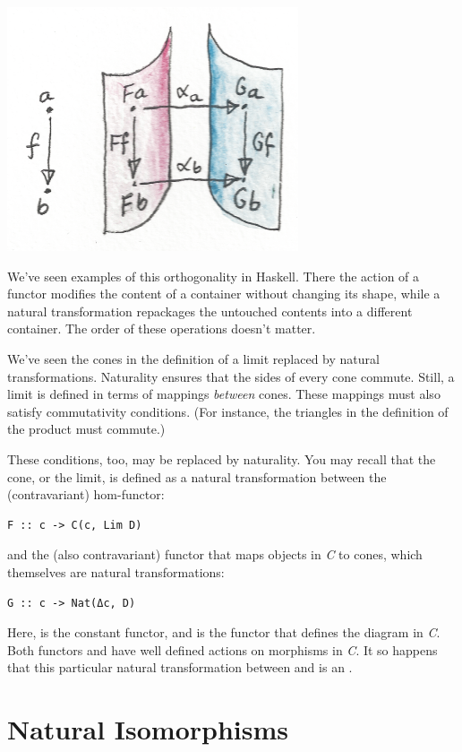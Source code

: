 \includegraphics{images/sheets.png}

We've seen examples of this orthogonality in Haskell. There the action
of a functor modifies the content of a container without changing its
shape, while a natural transformation repackages the untouched contents
into a different container. The order of these operations doesn't
matter.

We've seen the cones in the definition of a limit replaced by natural
transformations. Naturality ensures that the sides of every cone
commute. Still, a limit is defined in terms of mappings \emph{between}
cones. These mappings must also satisfy commutativity conditions. (For
instance, the triangles in the definition of the product must commute.)

These conditions, too, may be replaced by naturality. You may recall
that the  cone, or the limit, is defined as a natural
transformation between the (contravariant) hom-functor:

\begin{verbatim}
F :: c -> C(c, Lim D)
\end{verbatim}

and the (also contravariant) functor that maps objects in \emph{C} to
cones, which themselves are natural transformations:

\begin{verbatim}
G :: c -> Nat(Δc, D)
\end{verbatim}

Here,  is the constant functor, and  is the functor
that defines the diagram in \emph{C}. Both functors  and
 have well defined actions on morphisms in \emph{C}. It so
happens that this particular natural transformation between 
and  is an .

\section{Natural Isomorphisms}\label{natural-isomorphisms}

